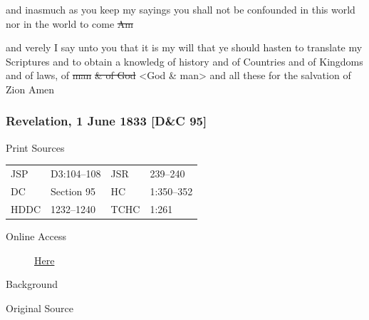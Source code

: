 				and inasmuch as you keep my sayings you shall not be confounded in this world nor in the world to come \sout{Am}
				
				and verely I say unto you that it is my will that ye should hasten to translate my Scriptures and to obtain a knowledg of history and of Countries and of Kingdoms and of laws, of \sout{man} \sout{\& of God} <God \& man> and all these for the salvation of Zion Amen
				
		\subsubsection{Revelation, 1 June 1833 [D\&C 95]}
			\label{EMS-1833-JS-1-JUN-1833}
		
			\begin{description}
				\item[Print Sources]
			\end{description}

				\begin{tabular}{p{0.5in}p{1in}p{0.5in}p{1in}}
				JSP	 	& D3:104--108		& JSR 		& 239--240 \\
				DC	 	& Section 95 		& HC 		& 1:350--352 \\
				HDDC 	& 1232--1240		& TCHC 		& 1:261 \\
				\end{tabular}
			
			\begin{description}
				\item[Online Access] \href{https://www.josephsmithpapers.org/paper-summary/revelation-1-june-1833-dc-95/1}{Here}
			\end{description}
			
			\begin{description}
				\item[Background]
			\end{description}
			
			
			\begin{description}
				\item[Original Source]
			\end{description}
			
